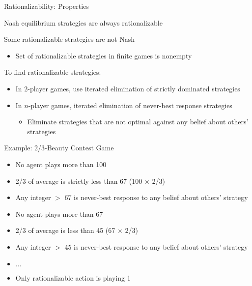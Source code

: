 \documentclass[11pt,aspectratio=169]{beamer}
\begin{document}
  \begin{frame}{Rationalizability: Properties}
   \begin{itemizes}
    \item Nash equilibrium strategies are always rationalizable
    \item<+-> Some rationalizable strategies are not Nash
    \begin{itemize}
     \item Set of rationalizable strategies in finite games is nonempty
    \end{itemize}
    \item<+-> To find rationalizable strategies:
    \begin{itemize}
     \setlength{\itemsep}{1.1em}
     \item<+-> In \alert{2-player} games, use iterated elimination of strictly dominated strategies
     \item<+-> In \alert{$n$-player} games, iterated elimination of \alert{never-best response} strategies
     \begin{itemize}
      \item Eliminate strategies that are not optimal against any belief about others' strategies
     \end{itemize}
    \end{itemize}
   \end{itemizes}
  \end{frame}
  
  \begin{frame}{Example: 2/3-Beauty Contest Game}
   \begin{itemize}[<+->]
    \item No agent plays more than 100
    \item 2/3 of average is strictly less than 67 (100 $\times$ 2/3)
    \item Any integer $>$ 67 is never-best response to any belief about others' strategy
    \item No agent plays more than 67
    \item 2/3 of average is less than 45 (67 $\times$ 2/3)
    \item Any integer $>$ 45 is never-best response to any belief about others' strategy
    \item $\dots$
    \item Only rationalizable action is playing 1
   \end{itemize}
  \end{frame}
 
\end{document}
